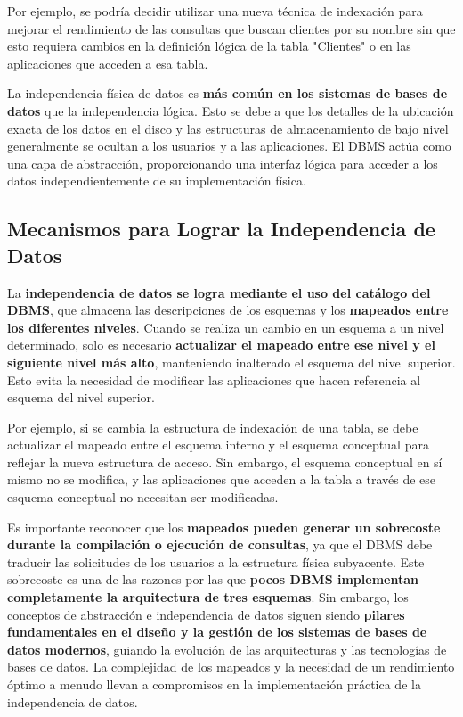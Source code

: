 Por ejemplo, se podría decidir utilizar una nueva técnica de indexación para mejorar el rendimiento de las consultas que buscan clientes por su nombre sin que esto requiera cambios en la definición lógica de la tabla "Clientes" o en las aplicaciones que acceden a esa tabla.

La independencia física de datos es \textbf{más común en los sistemas de bases de datos} que la independencia lógica.  Esto se debe a que los detalles de la ubicación exacta de los datos en el disco y las estructuras de almacenamiento de bajo nivel generalmente se ocultan a los usuarios y a las aplicaciones.  El DBMS actúa como una capa de abstracción, proporcionando una interfaz lógica para acceder a los datos independientemente de su implementación física.

\subsection{Mecanismos para Lograr la Independencia de Datos}

La \textbf{independencia de datos se logra mediante el uso del catálogo del DBMS}, que almacena las descripciones de los esquemas y los \textbf{mapeados entre los diferentes niveles}.  Cuando se realiza un cambio en un esquema a un nivel determinado, solo es necesario \textbf{actualizar el mapeado entre ese nivel y el siguiente nivel más alto}, manteniendo inalterado el esquema del nivel superior.  Esto evita la necesidad de modificar las aplicaciones que hacen referencia al esquema del nivel superior.

Por ejemplo, si se cambia la estructura de indexación de una tabla, se debe actualizar el mapeado entre el esquema interno y el esquema conceptual para reflejar la nueva estructura de acceso.  Sin embargo, el esquema conceptual en sí mismo no se modifica, y las aplicaciones que acceden a la tabla a través de ese esquema conceptual no necesitan ser modificadas.

Es importante reconocer que los \textbf{mapeados pueden generar un sobrecoste durante la compilación o ejecución de consultas}, ya que el DBMS debe traducir las solicitudes de los usuarios a la estructura física subyacente.  Este sobrecoste es una de las razones por las que \textbf{pocos DBMS implementan completamente la arquitectura de tres esquemas}.  Sin embargo, los conceptos de abstracción e independencia de datos siguen siendo \textbf{pilares fundamentales en el diseño y la gestión de los sistemas de bases de datos modernos}, guiando la evolución de las arquitecturas y las tecnologías de bases de datos. La complejidad de los mapeados y la necesidad de un rendimiento óptimo a menudo llevan a compromisos en la implementación práctica de la independencia de datos.

